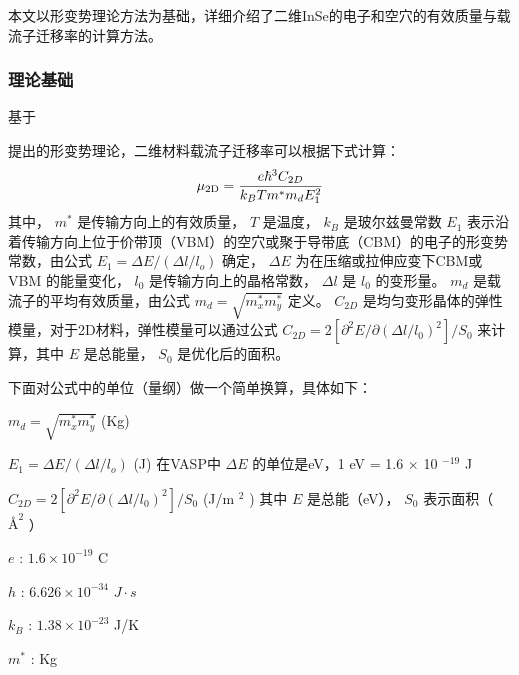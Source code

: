 \documentclass[a4paper,12pt,english]{sphinxmanual}
\begin{document}
\sphinxAtStartPar
本文以形变势理论方法为基础，详细介绍了二维InSe的电子和空穴的有效质量与载流子迁移率的计算方法。


\subsubsection{理论基础}
\label{\detokenize{tutorials/vasp/mobility:id1}}
\sphinxAtStartPar
基于 %
\begin{footnote}[27]\sphinxAtStartFootnote
{}
%
\end{footnote} 提出的形变势理论，二维材料载流子迁移率可以根据下式计算：
\begin{equation*}
\begin{split}\mu_{\rm 2D} = \frac{e\hbar^3C_{2D}}{k_BTm^{\ast}m_dE_1^2}\end{split}
\end{equation*}
\sphinxAtStartPar
其中， \(m^{\ast}\) 是传输方向上的有效质量， \(T\) 是温度， \(k_B\) 是玻尔兹曼常数 \(E_1\) 表示沿着传输方向上位于价带顶（VBM）的空穴或聚于导带底（CBM）的电子的形变势常数，由公式 \(E_1 = {\Delta}E/({\Delta}l/l_o)\) 确定， \({\Delta}E\) 为在压缩或拉伸应变下CBM或VBM 的能量变化， \(l_0\) 是传输方向上的晶格常数， \({\Delta}l\) 是 \(l_0\) 的变形量。 \(m_d\) 是载流子的平均有效质量，由公式 \(m_d = \sqrt{m_x^{\ast}m_y^{\ast}}\) 定义。 \(C_{2D}\) 是均匀变形晶体的弹性模量，对于2D材料，弹性模量可以通过公式 \(C_{2D}=2[{\partial}^2E/{\partial}({\Delta}l/l_0)^2]/S_0\) 来计算，其中 \(E\) 是总能量， \(S_0\) 是优化后的面积。

\sphinxAtStartPar
下面对公式中的单位（量纲）做一个简单换算，具体如下：

\begin{DUlineblock}{0em}
\item[] \(m_d = \sqrt{m_x^{\ast}m_y^{\ast}}\) (Kg)
\item[] \(E_1 = {\Delta}E/({\Delta}l/l_o)\) (J) 在VASP中 \({\Delta}E\) 的单位是eV，1 eV = 1.6 \(\times\) 10 \(^{-19}\) J
\item[] \(C_{2D} = 2[{\partial}^2E/{\partial}({\Delta}l/l_0)^2]/S_0\) (J/m \(^2\) ) 其中 \(E\) 是总能（eV）， \(S_0\) 表示面积（ \(Å^2\) ）
\item[] \(e\) : \(1.6 \times 10^{-19}\) C
\item[] \(h\) : \(6.626 \times 10^{-34}\) \(J \cdot s\)
\item[] \(k_B\) : \(1.38 \times 10^{-23}\) J/K
\item[] \(m^{\ast}\) : Kg
\end{DUlineblock}
\end{document}

